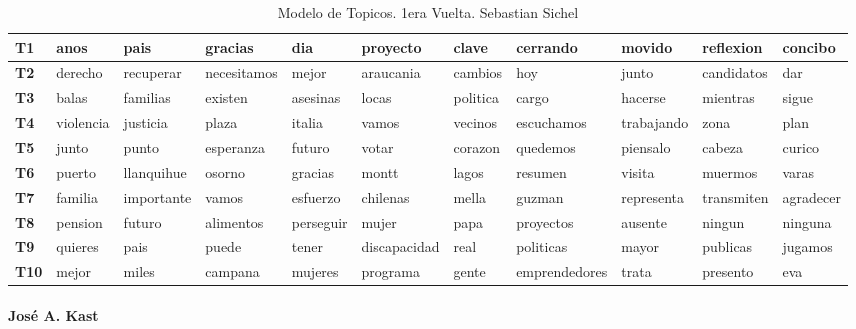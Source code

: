 \documentclass[
  10pt,
  letterpaper,
]{report}
\begin{document}
\begin{table}[!h]

\caption{\label{tab:Tabla5_sichel}Modelo de Topicos. 1era Vuelta. Sebastian Sichel}
\centering
\fontsize{6}{8}\selectfont
\begin{tabular}[t]{>{\raggedright\arraybackslash}p{0.08in}|>{\raggedright\arraybackslash}p{0.4in}|>{\raggedright\arraybackslash}p{0.4in}|>{\raggedright\arraybackslash}p{0.4in}|>{\raggedright\arraybackslash}p{0.4in}|>{\raggedright\arraybackslash}p{0.4in}|>{\raggedright\arraybackslash}p{0.4in}|>{\raggedright\arraybackslash}p{0.4in}|>{\raggedright\arraybackslash}p{0.4in}|>{\raggedright\arraybackslash}p{0.4in}|l}
\hline
T1 & anos & pais & gracias & dia & proyecto & clave & cerrando & movido & reflexion & concibo\\
\hline
\textbf{T2} & derecho & recuperar & necesitamos & mejor & araucania & cambios & hoy & junto & candidatos & dar\\
\hline
\textbf{T3} & balas & familias & existen & asesinas & locas & politica & cargo & hacerse & mientras & sigue\\
\hline
\textbf{T4} & violencia & justicia & plaza & italia & vamos & vecinos & escuchamos & trabajando & zona & plan\\
\hline
\textbf{T5} & junto & punto & esperanza & futuro & votar & corazon & quedemos & piensalo & cabeza & curico\\
\hline
\textbf{T6} & puerto & llanquihue & osorno & gracias & montt & lagos & resumen & visita & muermos & varas\\
\hline
\textbf{T7} & familia & importante & vamos & esfuerzo & chilenas & mella & guzman & representa & transmiten & agradecer\\
\hline
\textbf{T8} & pension & futuro & alimentos & perseguir & mujer & papa & proyectos & ausente & ningun & ninguna\\
\hline
\textbf{T9} & quieres & pais & puede & tener & discapacidad & real & politicas & mayor & publicas & jugamos\\
\hline
\textbf{T10} & mejor & miles & campana & mujeres & programa & gente & emprendedores & trata & presento & eva\\
\hline
\end{tabular}
\end{table}

\hypertarget{josuxe9-a.-kast}{%
\paragraph{José A. Kast}\label{josuxe9-a.-kast}}
\end{document}
